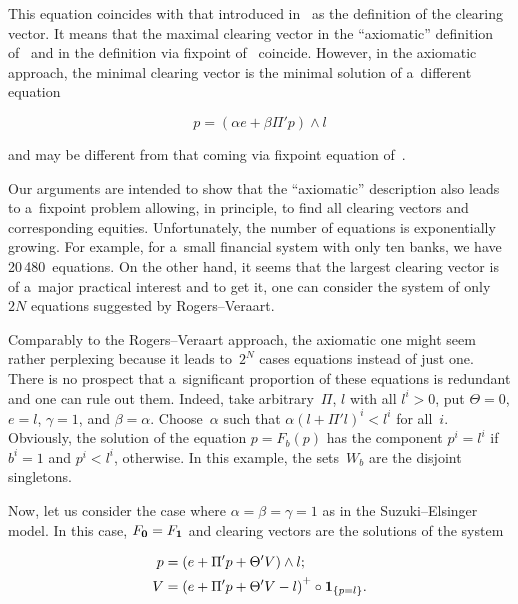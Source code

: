 \begin{multicols}{2}
This equation coincides with that introduced in~\cite{RV2013} as the definition of the clearing vector. 
It means that the maximal clearing vector in the ``axiomatic'' definition of~\cite{Ararat2019} and in the  
definition via fixpoint of~\cite{RV2013} coincide. However, in the axiomatic approach, the minimal clearing vector is the minimal solution of 
a~different equation

\noindent
$$ 
p = \left(\alpha e+\beta \Pi' p \right) \wedge l
$$

\vspace*{-4pt}

\noindent
and may be different  from that coming via fixpoint equation of~\cite{RV2013}. 

Our arguments are intended to show that  the  ``axiomatic'' description also leads 
to a~fixpoint problem allowing, in principle, to find all clearing vectors and corresponding equities. Unfortunately, the number of equations is exponentially 
growing. For example, for a~small financial system with only ten banks,  we have  20\,480~equations. On the other hand, it seems that the largest 
clearing vector is of a~major practical interest and to get it, one  can consider the system of only $2N$ equations suggested by Rogers--Veraart.   


Comparably to the  Rogers--Veraart approach, the axiomatic one might seem rather perplexing because it leads to~$2^N$ cases equations
 instead of just one. There is no  prospect that a~significant proportion of these equations is redundant and one can rule out them. 
 Indeed, take arbitrary~$\Pi$, $l$ with all  $l^i > 0$, put $\Theta = 0$, $e = l$, $\gamma = 1$, and $\beta=\alpha$. 
 Choose~$\alpha$ such that $\alpha (l + \Pi' l)^i < l^i$ for all~$i$. Obviously, the solution of the equation $p = F_b(p)$ has  
 the component  $p^i = l^i$ if $b^i=1$ and $p^i < l^i$, otherwise. In this example, the sets~$W_b$ are the disjoint singletons.
 


Now, let us consider the case where $\alpha = \beta = \gamma = 1$ as in the  
Suzuki--Elsinger model. In this case, $F_{\bf 0} = F_{\bf 1}$ and clearing vectors are the solutions of the system 

\vspace*{-4pt}

\noindent
\begin{align*}
 p &= \left(e + \Pi' p + \Theta' V\right) \wedge l; \\
V &= \left(e + \Pi' p + \Theta' V - l\right)^+ \circ {\bf 1}_{\{p = l\}}.
\end{align*}


\end{multicols}

